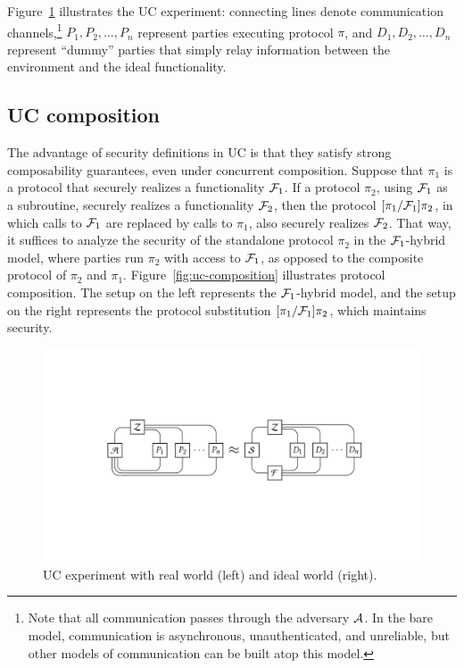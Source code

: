 Figure~\ref{fig:uc-experiment} illustrates the UC experiment: connecting lines
denote communication channels,\footnote{Note that all communication passes
  through the adversary $\mathcal{{A}}$. In the bare model, communication is
  asynchronous, unauthenticated, and unreliable, but other models of
  communication can be built atop this model.} $P_1, P_2, \ldots, P_n$ represent
parties executing protocol $\pi$, and $D_1, D_2, \ldots, D_n$ represent ``dummy''
parties that simply relay information between the environment and the ideal
functionality.

\subsection{UC composition}
\label{subsec:composition}

The advantage of security definitions in UC is that they satisfy strong
composability guarantees, even under concurrent composition. Suppose that $\pi_1$
is a protocol that securely realizes a functionality $\mathcal{{F}}_1$. If a protocol
$\pi_2$, using $\mathcal{{F}}_1$ as a subroutine, securely realizes a functionality
$\mathcal{{F}}_2$, then the protocol $[\pi_1 / \mathcal{{F}}_1]\pi_2$, in which calls to
$\mathcal{{F}}_1$ are replaced by calls to $\pi_1$, also securely realizes
$\mathcal{{F}}_2$. That way, it suffices to analyze the security of the standalone
protocol $\pi_2$ in the $\mathcal{{F}}_1$-hybrid model, where parties run $\pi_2$ with
access to $\mathcal{{F}}_1$, as opposed to the composite protocol of $\pi_2$ and
$\pi_1$. Figure~\ref{fig:uc-composition} illustrates protocol composition. The
setup on the left represents the $\mathcal{{F}}_1$-hybrid model, and the setup on the
right represents the protocol substitution $[\pi_1 / \mathcal{{F}}_1]\pi_2$, which
maintains security.

\begin{figure}
  \centering
  \includegraphics[width=\linewidth]{graphics/uc-experiment}
  \caption{UC experiment with real world (left) and ideal world (right).}
  \label{fig:uc-experiment}
\end{figure}

